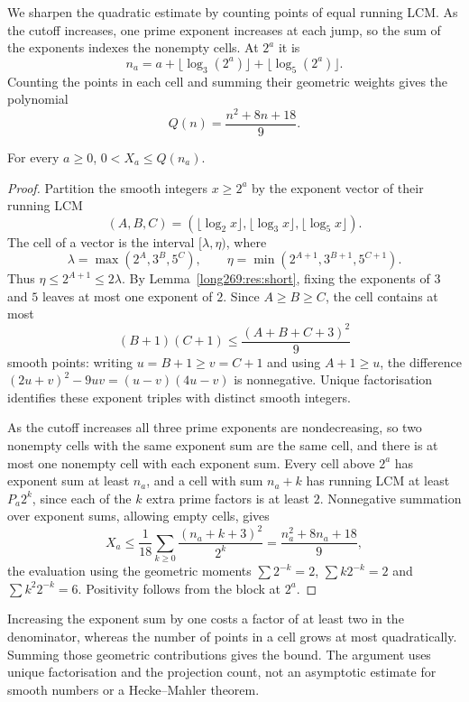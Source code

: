 \documentclass[11pt]{article}
\theoremstyle{remark}
\theoremstyle{plain}
\newcommand{\lo}{\lambda}
\newcommand{\hi}{\eta}
\begin{document}
We sharpen the quadratic estimate by counting points of equal running LCM.
As the cutoff increases, one prime exponent increases at each jump, so
the sum of the exponents indexes the nonempty cells. At $2^a$ it is
\[
 n_a=a+\lfloor\log_3(2^a)\rfloor+\lfloor\log_5(2^a)\rfloor.
\]
Counting the points in each cell and summing their geometric weights
gives the polynomial
\[
 Q(n)=\frac{n^2+8n+18}{9}.
\]

\begin{theorem}\label{long269:res:actual-tail-bound}
For every $a\ge0$, $0<X_a\le Q(n_a)$.
\end{theorem}

\begin{proof}
Partition the smooth integers $x\ge2^{a}$ by the exponent vector of their running LCM
\[
 (A,B,C)=(\lfloor\log_2x\rfloor,\lfloor\log_3x\rfloor,\lfloor\log_5x\rfloor).
\]
The cell of a vector is the interval $[\lo,\hi)$, where
\[
 \lo=\max(2^{A},3^{B},5^{C}),\qquad
 \hi=\min(2^{A+1},3^{B+1},5^{C+1}).
\]
Thus $\hi\le2^{A+1}\le2\lo$.  By Lemma~\ref{long269:res:short}, fixing the
exponents of $3$ and $5$ leaves at most one exponent of $2$.  Since $A\ge B\ge C$, the cell
contains at most
\[
 (B+1)(C+1)\le\frac{(A+B+C+3)^{2}}{9}
\]
smooth points: writing $u=B+1\ge v=C+1$ and using $A+1\ge u$, the difference
$(2u+v)^{2}-9uv=(u-v)(4u-v)$ is nonnegative.  Unique factorisation identifies
these exponent triples with distinct smooth integers.

As the cutoff increases all three prime exponents are nondecreasing, so two
nonempty cells with the same exponent sum are the same cell, and there is at most one nonempty cell with each exponent sum.  Every cell above
$2^a$ has exponent sum at least $n_a$, and a cell with sum $n_a+k$ has
running LCM at least $P_a2^k$,
since each of the $k$ extra prime factors is at least $2$.  Nonnegative summation over exponent sums, allowing empty cells, gives
\[
 X_a\le\frac1{18}\sum_{k\ge0}\frac{(n_a+k+3)^{2}}{2^{k}}
      =\frac{n_a^{2}+8n_a+18}{9},
\]
the evaluation using the geometric moments $\sum2^{-k}=2$, $\sum k2^{-k}=2$
and $\sum k^{2}2^{-k}=6$.  Positivity follows from the block at $2^{a}$.
\end{proof}

Increasing the exponent sum by one costs a factor of at least two in
the denominator, whereas
the number of points in a cell grows at most quadratically.  Summing those
geometric contributions gives the bound.  The argument uses unique
factorisation and the projection count, not an asymptotic estimate for
smooth numbers or a Hecke--Mahler theorem.
\end{document}
